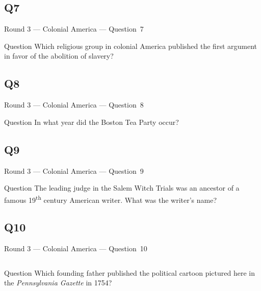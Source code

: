 \documentclass[11pt]{beamer}
\begin{document}
\subsection*{Q7}
\begin{frame}[t]{Round 3 --- Colonial America --- \mbox{Question 7}}
\vspace{-0.5em}
\begin{block}{Question}
Which religious group in colonial America published the first argument in favor of the abolition of slavery?
\end{block}
\end{frame}
\subsection*{Q8}
\begin{frame}[t]{Round 3 --- Colonial America --- \mbox{Question 8}}
\vspace{-0.5em}
\begin{block}{Question}
In what year did the Boston Tea Party occur?
\end{block}
\end{frame}
\subsection*{Q9}
\begin{frame}[t]{Round 3 --- Colonial America --- \mbox{Question 9}}
\vspace{-0.5em}
\begin{block}{Question}
The leading judge in the Salem Witch Trials was an ancestor of a famous 19\textsuperscript{th} century American writer. What was the writer's name?
\end{block}
\end{frame}
\subsection*{Q10}
\begin{frame}[t]{Round 3 --- Colonial America --- \mbox{Question 10}}
\vspace{-0.5em}
\begin{columns}[T,totalwidth=\linewidth]
\begin{column}{0.32\linewidth}
\begin{block}{Question}
Which founding father published the political cartoon pictured here in the \emph{Pennsylvania Gazette} in 1754?
\end{block}
\end{column}
\begin{column}{0.65\linewidth}
\begin{center}
\texttt{[image: \{Images/joinordie]}.jpg}
\end{center}
\end{column}
\end{columns}
\end{frame}
\end{document}
